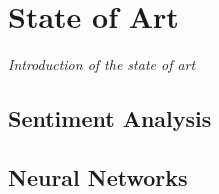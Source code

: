 \chapter{State of Art}
\label{chap:state-of-art}
\textit{Introduction of the state of art}

\clearpage

\section{Sentiment Analysis}

\clearpage

\section{Neural Networks}

